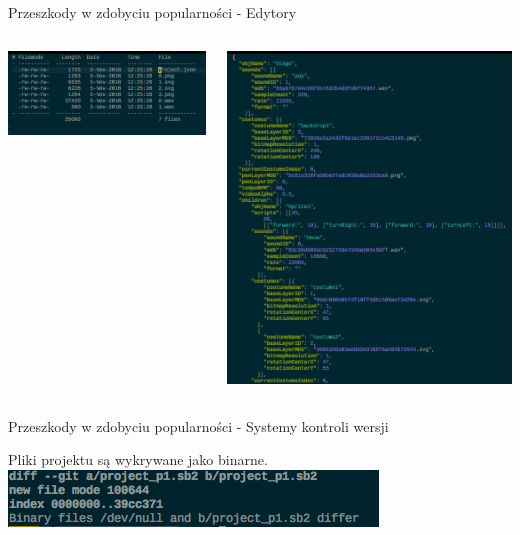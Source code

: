 \documentclass[presentation]{beamer}
\begin{document}
\begin{frame}[label=sec-1-6]{Przeszkody w zdobyciu popularności - Edytory}
\begin{columns}
\begin{column}{0.4\textwidth}
\includegraphics[width=.9\linewidth]{./img/scratch-project-listing.png}
\end{column}
\begin{column}{0.6\textwidth}
\includegraphics[width=.9\linewidth]{./img/scratch-project-json.png}
\end{column}
\end{columns}
\end{frame}
\begin{frame}[label=sec-1-7]{Przeszkody w zdobyciu popularności - Systemy kontroli wersji}
\begin{block}{Pliki projektu są wykrywane jako binarne.}
\includegraphics[width=.9\linewidth]{./img/scratch-git-reaction.png}
\end{block}
\end{frame}
\end{document}
